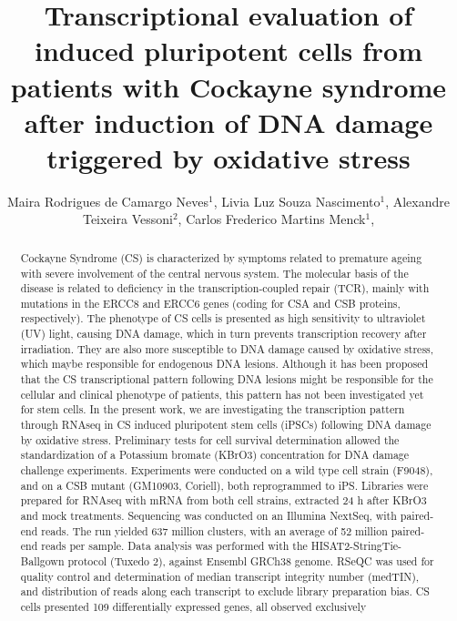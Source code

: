\documentclass[twoside]{article}
\title{\vspace{-15mm}\fontsize{24pt}{10pt}\selectfont\textbf{ Transcriptional evaluation of induced pluripotent cells from patients with Cockayne syndrome after induction of DNA damage triggered by oxidative stress }} %
\author{ Maira Rodrigues de Camargo Neves$^{1}$, Livia Luz Souza Nascimento$^{1}$, Alexandre Teixeira Vessoni$^{2}$, Carlos Frederico Martins Menck$^{1}$, }
\affil{ 1 Department of Microbiology, Institute of Biomedical Sciences, University of São Paulo

2 Department of Medicine, Washington University in Saint Louis

 }
\date{}
\begin{document}
  
  
  \maketitle %
  
  
  \thispagestyle{fancy} %
  
  
  \begin{abstract}
  Cockayne Syndrome (CS) is characterized by symptoms related to premature ageing with
severe involvement of the central nervous system. The molecular basis of the disease is related
to deficiency in the transcription-coupled repair (TCR), mainly with mutations in the ERCC8 and
ERCC6 genes (coding for CSA and CSB proteins, respectively). The phenotype of CS cells is
presented as high sensitivity to ultraviolet (UV) light, causing DNA damage, which in turn
prevents transcription recovery after irradiation. They are also more susceptible to DNA
damage caused by oxidative stress, which maybe responsible for endogenous DNA lesions.
Although it has been proposed that the CS transcriptional pattern following DNA lesions might
be responsible for the cellular and clinical phenotype of patients, this pattern has not been
investigated yet for stem cells. In the present work, we are investigating the transcription
pattern through RNAseq in CS induced pluripotent stem cells (iPSCs) following DNA damage by
oxidative stress. Preliminary tests for cell survival determination allowed the standardization of
a Potassium bromate (KBrO3) concentration for DNA damage challenge experiments.
Experiments were conducted on a wild type cell strain (F9048), and on a CSB mutant
(GM10903, Coriell), both reprogrammed to iPS. Libraries were prepared for RNAseq with
mRNA from both cell strains, extracted 24 h after KBrO3 and mock treatments. Sequencing
was conducted on an Illumina NextSeq, with paired-end reads. The run yielded 637 million
clusters, with an average of 52 million paired-end reads per sample. Data analysis was
performed with the HISAT2-StringTie-Ballgown protocol (Tuxedo 2), against Ensembl GRCh38
genome. RSeQC was used for quality control and determination of median transcript integrity
number (medTIN), and distribution of reads along each transcript to exclude library
preparation bias. CS cells presented 109 differentially expressed genes, all observed exclusively

\end{abstract}
\end{document}
